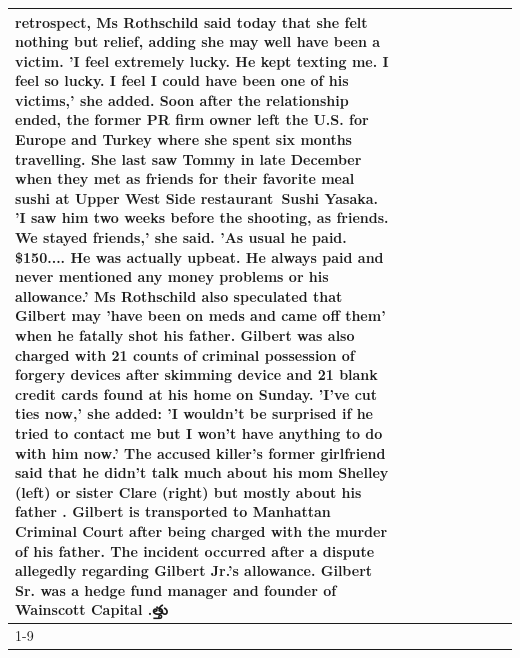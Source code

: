 \begin{table}[H]
\begin{tabular}{lllrlllll}
retrospect, Ms Rothschild said today that she felt nothing but relief, adding she may well have been a victim. 'I feel extremely lucky. He kept texting me. I feel so lucky. I feel I could have been one of his victims,' she added. Soon after the relationship ended, the former PR firm owner left the U.S. for Europe and Turkey where she spent six months  travelling. She last saw Tommy in late December when they met as friends for their favorite meal sushi at Upper West Side restaurant Sushi Yasaka. 'I saw him two weeks before the shooting, as friends. We stayed friends,' she said. 'As usual he paid. \$150.... He was actually upbeat. He always paid and never mentioned any money problems or his allowance.' Ms Rothschild also speculated that Gilbert may 'have been on meds and came off them' when he fatally shot his father. Gilbert was also charged with 21 counts of criminal possession of forgery devices after skimming device and 21 blank credit cards found at his home on Sunday. 'I've cut ties now,' she added: 'I wouldn’t be surprised if he tried to contact me but I won’t have anything to do with him now.' The accused killer's former girlfriend said that he didn't talk much about his mom Shelley (left) or sister Clare (right) but mostly about his father . Gilbert is transported to Manhattan Criminal Court  after being charged with the murder of his father. The incident occurred after a dispute allegedly regarding Gilbert Jr.'s allowance. Gilbert Sr. was a hedge fund manager and founder of Wainscott Capital .త్తు \\
\cline{1-9}

\end{tabular}
\end{table}
